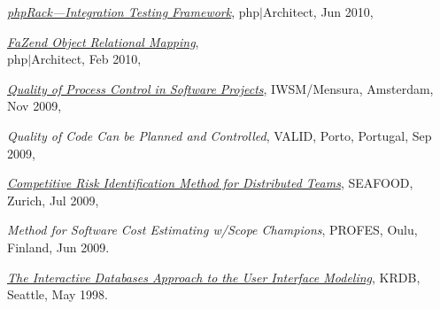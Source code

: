 \documentclass{yb}
\begin{document}
\begin{samepage}
\emph{\href{https://www.yegor256.com/pdf/2010/phpArchitect-phpRack.pdf}{phpRack---Integration Testing Framework}},\newline
php$|$Architect, Jun 2010,
\end{samepage}

\begin{samepage}
\emph{\href{https://www.yegor256.com/pdf/2010/phpArchitect-fazend-orm.pdf}{FaZend Object Relational Mapping}},\\
php$|$Architect, Feb 2010,
\end{samepage}

\begin{samepage}
\emph{\href{https://www.yegor256.com/pdf/2009/IWSM09-article.pdf}{Quality of Process Control in Software Projects}},\newline
IWSM/Mensura, Amsterdam, Nov 2009,
\end{samepage}

\begin{samepage}
\emph{Quality of Code Can be Planned and Controlled},\newline
VALID, Porto, Portugal, Sep 2009,
\end{samepage}

\begin{samepage}
\emph{\href{https://www.yegor256.com/pdf/2009/SEAFOOD09-article.pdf}{Competitive Risk Identification Method for Distributed Teams}},\newline
SEAFOOD, Zurich, Jul 2009,
\end{samepage}

\begin{samepage}
\emph{Method for Software Cost Estimating w/Scope Champions},\newline
PROFES, Oulu, Finland, Jun 2009.
\end{samepage}

\begin{samepage}
\emph{\href{https://www.yegor256.com/pdf/1998/KRDB98-article.pdf}{The Interactive Databases Approach to the User Interface Modeling}},\newline
KRDB, Seattle, May 1998.
\end{samepage}
\end{document}
